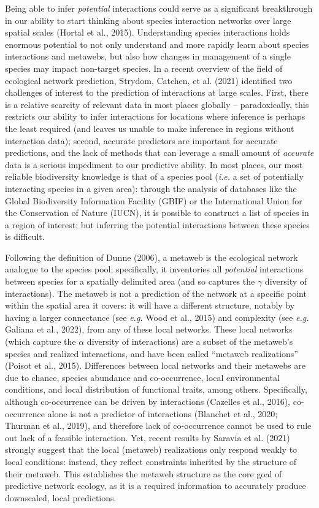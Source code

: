 \documentclass[11pt]{article}
\begin{document}
Being able to infer \emph{potential} interactions could serve as a
significant breakthrough in our ability to start thinking about species
interaction networks over large spatial scales (Hortal et al., 2015).
Understanding species interactions holds enormous potential to not only
understand and more rapidly learn about species interactions and
metawebs, but also how changes in management of a single species may
impact non-target species. In a recent overview of the field of
ecological network prediction, Strydom, Catchen, et al. (2021)
identified two challenges of interest to the prediction of interactions
at large scales. First, there is a relative scarcity of relevant data in
most places globally -- paradoxically, this restricts our ability to
infer interactions for locations where inference is perhaps the least
required (and leaves us unable to make inference in regions without
interaction data); second, accurate predictors are important for
accurate predictions, and the lack of methods that can leverage a small
amount of \emph{accurate} data is a serious impediment to our predictive
ability. In most places, our most reliable biodiversity knowledge is
that of a species pool (\emph{i.e.} a set of potentially interacting
species in a given area): through the analysis of databases like the
Global Biodiversity Information Facility (GBIF) or the International
Union for the Conservation of Nature (IUCN), it is possible to construct
a list of species in a region of interest; but inferring the potential
interactions between these species is difficult.

Following the definition of Dunne (2006), a metaweb is the ecological
network analogue to the species pool; specifically, it inventories all
\emph{potential} interactions between species for a spatially delimited
area (and so captures the \(\gamma\) diversity of interactions). The
metaweb is not a prediction of the network at a specific point within
the spatial area it covers: it will have a different structure, notably
by having a larger connectance (see \emph{e.g.} Wood et al., 2015) and
complexity (see \emph{e.g.} Galiana et al., 2022), from any of these
local networks. These local networks (which capture the \(\alpha\)
diversity of interactions) are a subset of the metaweb's species and
realized interactions, and have been called ``metaweb realizations''
(Poisot et al., 2015). Differences between local networks and their
metawebs are due to chance, species abundance and co-occurrence, local
environmental conditions, and local distribution of functional traits,
among others. Specifically, although co-occurrence can be driven by
interactions (Cazelles et al., 2016), co-occurrence alone is not a
predictor of interactions (Blanchet et al., 2020; Thurman et al., 2019),
and therefore lack of co-occurrence cannot be used to rule out lack of a
feasible interaction. Yet, recent results by Saravia et al. (2021)
strongly suggest that the local (metaweb) realizations only respond
weakly to local conditions: instead, they reflect constraints inherited
by the structure of their metaweb. This establishes the metaweb
structure as the core goal of predictive network ecology, as it is a
required information to accurately produce downscaled, local
predictions.
\end{document}
